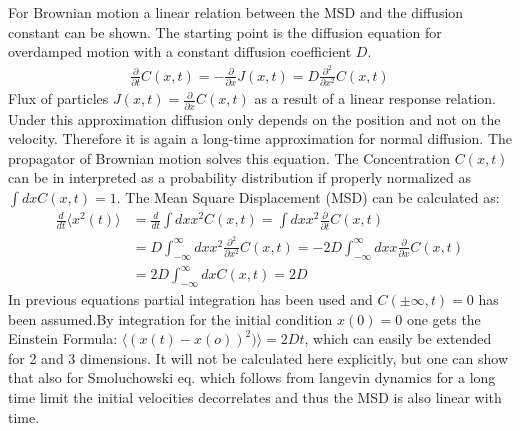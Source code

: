\documentclass[
  a4paper,BCOR10mm,oneside,
  bibtotoc,idxtotoc,
  headsepline,footsepline,%
  fleqn,openbib
]{scrbook}
\begin{document}
For Brownian motion a linear relation between the MSD and the diffusion constant can be shown. The starting point is the diffusion equation for overdamped motion with a constant diffusion coefficient $D$. 
\begin{align}
 \frac{\partial}{\partial t} C(x,t) = - \frac{\partial }{\partial x} J (x,t) = D  \frac{\partial^2 }{\partial x^2} C(x,t) \label{eq:ficks}
\end{align}
Flux of particles  $J(x,t)=\frac{\partial }{\partial x} C(x,t)$ as a result of a linear response relation. 
Under this approximation diffusion only depends on the position and not on the velocity. Therefore it is again a long-time approximation for normal diffusion. The propagator of Brownian motion solves this equation. The Concentration $C(x,t)$ can be in interpreted as a probability distribution if properly normalized as $\int dx C(x,t)=1$. The Mean Square Displacement (MSD) can be calculated as:
\begin{align}
 \frac{d}{dt} \langle x^2(t)\rangle & =\frac{d}{dt} \int dx x^2 C(x,t)=\int dx x^2 \frac{\partial}{\partial t} C(x,t) \\
&= D \int_{-\infty}^{\infty}dx x^2 \frac{\partial^2 }{\partial x^2} C(x,t) = -2 D \int_{-\infty}^{\infty} dx x \frac{\partial }{\partial x} C(x,t) \\ &= 2 D \int_{-\infty}^{\infty} dx C(x,t) =2 D
\end{align}
In previous equations partial integration has been used and  $C(\pm \infty,t)=0$ has been assumed.By integration for the initial condition $x(0) = 0$  one gets the Einstein Formula: $\langle (x(t)-x(o))^2)\rangle= 2Dt$, which can easily be extended for 2 and 3 dimensions. It will not be calculated here explicitly, but one can show that also for Smoluchowski eq. which follows from langevin dynamics for a long time limit the initial velocities decorrelates and thus the MSD is also linear with time.
\end{document}
